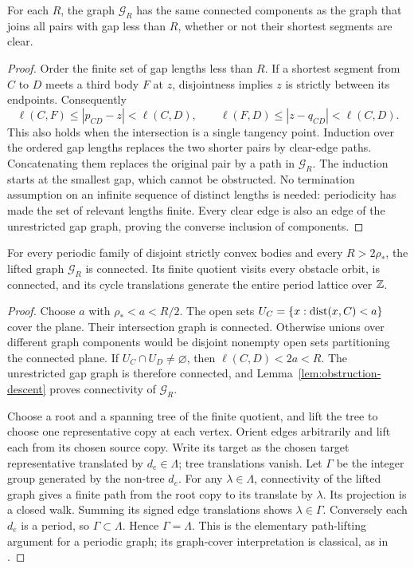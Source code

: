 \begin{lemma}\label{lem:obstruction-descent}
For each $R$, the graph $\mathcal G_R$ has the same connected components
as the graph that joins all pairs with gap less than $R$, whether or
not their shortest segments are clear.
\end{lemma}
\begin{proof}
Order the finite set of gap lengths less than $R$. If a shortest segment
from $C$ to $D$ meets a third body $F$ at $z$, disjointness implies
$z$ is strictly between its endpoints. Consequently
\[
 \ell(C,F)\le |p_{CD}-z|<\ell(C,D),\qquad
 \ell(F,D)\le |z-q_{CD}|<\ell(C,D).
\]
This also holds when the intersection is a single tangency point.
Induction over the ordered gap lengths replaces the two shorter pairs
by clear-edge paths. Concatenating them replaces the original pair by
a path in $\mathcal G_R$. The induction starts at the smallest gap,
which cannot be obstructed. No termination assumption on an infinite
sequence of distinct lengths is needed: periodicity has made the set
of relevant lengths finite. Every clear edge is also an edge of the
unrestricted gap graph, proving the converse inclusion of components.
\end{proof}

\begin{theorem}
\label{thm:geometric-completeness}
For every periodic family of disjoint strictly convex bodies and every
$R>2\rho_*$, the lifted graph $\mathcal G_R$ is connected. Its finite
quotient visits every obstacle orbit, is connected, and its cycle
translations generate the entire period lattice over $\mathbb Z$.
\end{theorem}
\begin{proof}
Choose $a$ with $\rho_*<a<R/2$. The open sets
$U_C=\{x:\operatorname{dist}(x,C)<a\}$ cover the plane. Their intersection graph
is connected. Otherwise unions over different graph components would
be disjoint nonempty open sets partitioning the connected plane. If
$U_C\cap U_D\ne\varnothing$, then $\ell(C,D)<2a<R$.
The unrestricted gap graph is therefore connected, and
Lemma~\ref{lem:obstruction-descent} proves connectivity of
$\mathcal G_R$.

Choose a root and a spanning tree of the finite quotient, and lift the
tree to choose one representative copy at each vertex. Orient edges
arbitrarily and lift each from its chosen source copy. Write its target
as the chosen target representative translated by $d_e\in\Lambda$;
tree translations vanish.
Let $\Gamma$ be the integer group generated by the non-tree $d_e$.
For any $\lambda\in\Lambda$, connectivity of the lifted graph gives
a finite path from the root copy to its translate by $\lambda$.
Its projection is a closed walk. Summing its signed edge translations
shows $\lambda\in\Gamma$. Conversely each $d_e$ is a period, so
$\Gamma\subset\Lambda$. Hence $\Gamma=\Lambda$.
This is the elementary path-lifting argument for a periodic graph;
its graph-cover interpretation is classical, as in \cite{Gross}.
\end{proof}

